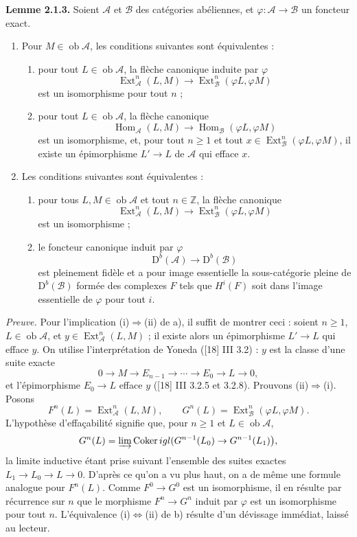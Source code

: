 \documentclass[11pt]{article}
\providecommand{\Ext}{\operatorname{Ext}}
\providecommand{\Ob}{\operatorname{ob}}
\begin{document}
\textbf{Lemme 2.1.3.} Soient $\mathcal A$ et $\mathcal B$ des catégories abéliennes, et $\varphi:\mathcal A\to\mathcal B$ un foncteur exact.
\begin{enumerate}[label=\alph*)]
\item Pour $M\in\Ob\mathcal A$, les conditions suivantes sont équivalentes :
\begin{enumerate}[label=(\roman*)]
\item pour tout $L\in\Ob\mathcal A$, la flèche canonique induite par $\varphi$
\[
\Ext^n_{\mathcal A}(L,M)\longrightarrow\Ext^n_{\mathcal B}(\varphi L,\varphi M)
\]
est un isomorphisme pour tout $n$ ;
\item pour tout $L\in\Ob\mathcal A$, la flèche canonique
\[
\operatorname{Hom}_{\mathcal A}(L,M)\longrightarrow\operatorname{Hom}_{\mathcal B}(\varphi L,\varphi M)
\]
est un isomorphisme, et, pour tout $n\ge1$ et tout $x\in\Ext^n_{\mathcal B}(\varphi L,\varphi M)$, il existe un épimorphisme $L'\to L$ de $\mathcal A$ qui efface $x$.
\end{enumerate}
\item Les conditions suivantes sont équivalentes :
\begin{enumerate}[label=(\roman*)]
\item pour tous $L,M\in\Ob\mathcal A$ et tout $n\in\mathbb Z$, la flèche canonique
\[
\Ext^n_{\mathcal A}(L,M)\longrightarrow\Ext^n_{\mathcal B}(\varphi L,\varphi M)
\]
est un isomorphisme ;
\item le foncteur canonique induit par $\varphi$
\[
\mathrm D^b(\mathcal A)\longrightarrow\mathrm D^b(\mathcal B)
\]
est pleinement fidèle et a pour image essentielle la sous-catégorie pleine de $\mathrm D^b(\mathcal B)$ formée des complexes $F$ tels que $H^i(F)$ soit dans l'image essentielle de $\varphi$ pour tout $i$.
\end{enumerate}
\end{enumerate}

\emph{Preuve.} Pour l'implication (i)$\Rightarrow$(ii) de a), il suffit de montrer ceci : soient $n\ge1$, $L\in\Ob\mathcal A$, et $y\in\Ext^n_{\mathcal A}(L,M)$ ; il existe alors un épimorphisme $L'\to L$ qui efface $y$. On utilise l'interprétation de Yoneda ([18] III 3.2) : $y$ est la classe d'une suite exacte
\[
0\longrightarrow M\longrightarrow E_{n-1}\longrightarrow\cdots\longrightarrow E_0\longrightarrow L\longrightarrow0,
\]
et l'épimorphisme $E_0\to L$ efface $y$ ([18] III 3.2.5 et 3.2.8). Prouvons (ii)$\Rightarrow$(i). Posons
\[
F^n(L)=\Ext^n_{\mathcal A}(L,M),\qquad
G^n(L)=\Ext^n_{\mathcal B}(\varphi L,\varphi M).
\]
L'hypothèse d'effaçabilité signifie que, pour $n\ge1$ et $L\in\Ob\mathcal A$,
\[
G^n(L)=\varinjlim\operatorname{Coker}igl(G^{n-1}(L_0)\to G^{n-1}(L_1)\bigr),
\]
la limite inductive étant prise suivant l'ensemble des suites exactes $L_1\to L_0\to L\to0$. D'après ce qu'on a vu plus haut, on a de même une formule analogue pour $F^n(L)$. Comme $F^0\to G^0$ est un isomorphisme, il en résulte par récurrence sur $n$ que le morphisme $F^n\to G^n$ induit par $\varphi$ est un isomorphisme pour tout $n$. L'équivalence (i)$\Leftrightarrow$(ii) de b) résulte d'un dévissage immédiat, laissé au lecteur.
\end{document}
